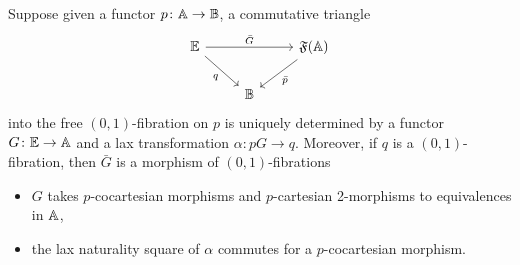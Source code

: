 \documentclass[a4paper,11pt]{article}
\newcommand{\FFr}{\mathfrak{F}}
\begin{document}
\begin{observation}\label{obs:map to free fib}
  Suppose given a functor $p \colon \tA \to \tB$, a commutative triangle
  \[
    \begin{tikzcd}
     \tE \ar[rr, "\bar{G}"] \ar[dr, "q"'] & & \FFr(\tA) \ar[dl, "\bar{p}"] \\
      & \tB
    \end{tikzcd}
  \]
  into the free $(0,1)$-fibration on $p$ is uniquely determined by a
  functor $G \colon \tE \to \tA$ and a lax transformation $\alpha
  \colon pG \to q$. Moreover, if $q$ is a $(0,1)$-fibration, then
  $\bar{G}$ is a morphism of $(0,1)$-fibrations \IFF{}
  \begin{itemize}
  \item $G$ takes $p$-cocartesian morphisms and $p$-cartesian
    2-morphisms to equivalences in $\mathbb{A}$,
  \item the lax naturality square of $\alpha$ commutes for a
    $p$-cocartesian morphism.
  \end{itemize}
\end{observation}
\end{document}
